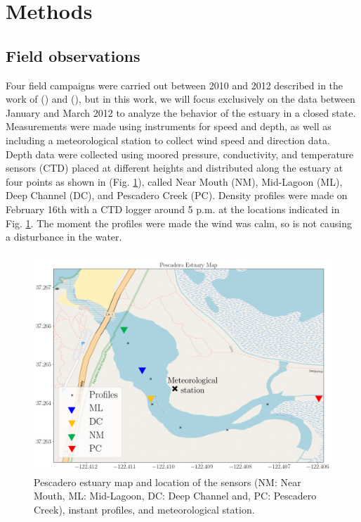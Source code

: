 \documentclass[11pt,letterpaper]{article}
\begin{document}
\section{Methods}

\subsection{Field observations}

Four field campaigns were carried out between 2010 and 2012 described in the work of \citeauthor{Williams2014} (\cite*{Williams2014}) and \citeauthor{williams2016} (\cite*{williams2016}), but in this work, we will focus exclusively on the data between January and March 2012 to analyze the behavior of the estuary in a closed state. Measurements were made using instruments for speed and depth, as well as including a meteorological station to collect wind speed and direction data. Depth data were collected using moored pressure, conductivity, and temperature sensors (CTD) placed at different heights and distributed along the estuary at four points as shown in (Fig. \ref{fig:mapPDO}), called Near Mouth (NM), Mid-Lagoon (ML), Deep Channel (DC), and Pescadero Creek (PC). Density profiles were made on February 16th with a CTD logger around 5 p.m. at the locations indicated in Fig. \ref{fig:mapPDO}. The moment the profiles were made the wind was calm, so is not causing a disturbance in the water.


\begin{figure}[h!]
    \centering
    \includegraphics[scale=0.6]{Imagenes/mapa2.png}
    \caption{Pescadero estuary map and location of the sensors (NM: Near Mouth, ML: Mid-Lagoon, DC: Deep Channel and, PC: Pescadero Creek), instant profiles, and meteorological station. }
    \label{fig:mapPDO}
\end{figure}
\end{document}
